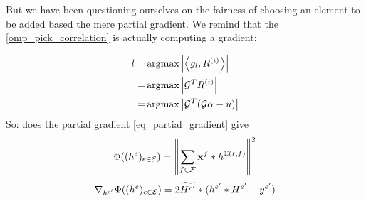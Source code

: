But we have been questioning ourselves on the fairness of choosing an element to be added based the mere partial gradient. We remind that the \ref{omp_pick_correlation} is actually computing a gradient:

\begin{align*}
l =& \operatorname*{\arg\!\max} \left|\left< g_l,R^{(i)} \right>\right| \\
=& \operatorname*{\arg\!\max} \left| \mathcal{G}^TR^{(i)}\right| \\
=& \operatorname*{\arg\!\max} \left| \mathcal{G}^T(\mathcal{G}\alpha - u)\right| \\
\end{align*}
So: does the partial gradient \ref{eq_partial_gradient} give 
\begin{align*}
\Phi((h^e)_{e \in \mathcal E}) = \left\| \sum_{f\in\mathcal F} \mathbf x^f * h^{\mathbb C(r,f)} \right\|^2
\end{align*}
\begin{align*} 
\nabla_{h^{e'}}\Phi((h^e)_{e \in \mathcal E}) = 2 \widetilde{H^{e'}} * (h^{e'}*H^{e'}-y^{e'})
\end{align*} \label{eq_partial_gradient}




